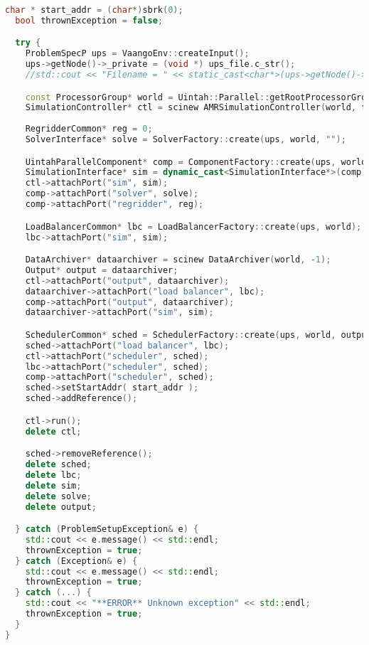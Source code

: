 \begin{enumerate}
\begin{lstlisting}[language=Cpp]
  char * start_addr = (char*)sbrk(0);
  bool thrownException = false;

  try {
    ProblemSpecP ups = VaangoEnv::createInput();
    ups->getNode()->_private = (void *) ups_file.c_str();
    //std::cout << "Filename = " << static_cast<char*>(ups->getNode()->_private) << std::endl;

    const ProcessorGroup* world = Uintah::Parallel::getRootProcessorGroup();
    SimulationController* ctl = scinew AMRSimulationController(world, false, ups);
    
    RegridderCommon* reg = 0;
    SolverInterface* solve = SolverFactory::create(ups, world, "");

    UintahParallelComponent* comp = ComponentFactory::create(ups, world, false, "");
    SimulationInterface* sim = dynamic_cast<SimulationInterface*>(comp);
    ctl->attachPort("sim", sim);
    comp->attachPort("solver", solve);
    comp->attachPort("regridder", reg);

    LoadBalancerCommon* lbc = LoadBalancerFactory::create(ups, world);
    lbc->attachPort("sim", sim);

    DataArchiver* dataarchiver = scinew DataArchiver(world, -1);
    Output* output = dataarchiver;
    ctl->attachPort("output", dataarchiver);
    dataarchiver->attachPort("load balancer", lbc);
    comp->attachPort("output", dataarchiver);
    dataarchiver->attachPort("sim", sim);

    SchedulerCommon* sched = SchedulerFactory::create(ups, world, output);
    sched->attachPort("load balancer", lbc);
    ctl->attachPort("scheduler", sched);
    lbc->attachPort("scheduler", sched);
    comp->attachPort("scheduler", sched);
    sched->setStartAddr( start_addr );
    sched->addReference();

    ctl->run();
    delete ctl;

    sched->removeReference();
    delete sched;
    delete lbc;
    delete sim;
    delete solve;
    delete output; 

  } catch (ProblemSetupException& e) {
    std::cout << e.message() << std::endl;
    thrownException = true;
  } catch (Exception& e) {
    std::cout << e.message() << std::endl;
    thrownException = true;
  } catch (...) {
    std::cout << "**ERROR** Unknown exception" << std::endl;
    thrownException = true;
  }
}
\end{lstlisting}
\end{enumerate}




